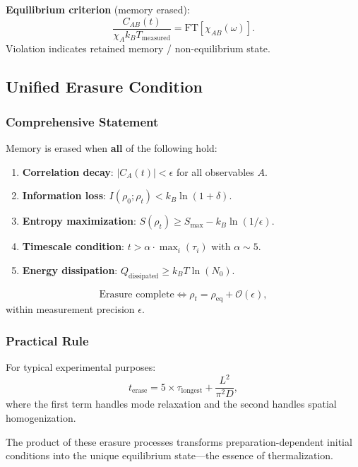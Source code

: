 \documentclass[11pt]{article}
\theoremstyle{defstyle}
\theoremstyle{mapstyle}
\begin{document}
\textbf{Equilibrium criterion} (memory erased):
\begin{equation}
\boxed{\frac{C_{AB}(t)}{\chi_A k_B T_{\text{measured}}} = \text{FT}[\chi_{AB}(\omega)].}
\end{equation}
Violation indicates retained memory / non-equilibrium state.

\subsection{Unified Erasure Condition}

\subsubsection{Comprehensive Statement}

Memory is erased when \textbf{all} of the following hold:
\begin{enumerate}[label=\arabic*.]
  \item \textbf{Correlation decay}: $|C_A(t)| < \epsilon$ for all observables $A$.
  \item \textbf{Information loss}: $I(\rho_0; \rho_t) < k_B \ln(1+\delta)$.
  \item \textbf{Entropy maximization}: $S(\rho_t) \ge S_{\max} - k_B \ln(1/\epsilon)$.
  \item \textbf{Timescale condition}: $t > \alpha \cdot \max_i(\tau_i)$ with $\alpha \sim 5$.
  \item \textbf{Energy dissipation}: $Q_{\text{dissipated}} \ge k_B T \ln(N_0)$.
\end{enumerate}

\begin{equation}
\boxed{\text{Erasure complete} \iff \rho_t = \rho_{\text{eq}} + \mathcal{O}(\epsilon),}
\end{equation}
within measurement precision $\epsilon$.

\subsubsection{Practical Rule}

For typical experimental purposes:
\begin{equation}
\boxed{t_{\text{erase}} = 5 \times \tau_{\text{longest}} + \frac{L^2}{\pi^2 D},}
\end{equation}
where the first term handles mode relaxation and the second handles spatial homogenization.

The product of these erasure processes transforms preparation-dependent initial conditions into the unique equilibrium state---the essence of thermalization.
\end{document}
